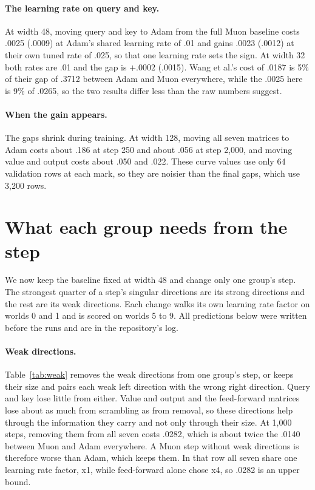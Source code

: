 \documentclass[11pt]{article}
\begin{document}
\paragraph{The learning rate on query and key.} At width 48, moving query and key to Adam from the full Muon baseline costs .0025 (.0009) at Adam's shared learning rate of .01 and gains .0023 (.0012) at their own tuned rate of .025, so that one learning rate sets the sign. At width 32 both rates are .01 and the gap is $+.0002$ (.0015). Wang et al.'s cost of .0187 is 5\% of their gap of .3712 between Adam and Muon everywhere, while the .0025 here is 9\% of .0265, so the two results differ less than the raw numbers suggest.

\paragraph{When the gain appears.} The gaps shrink during training. At width 128, moving all seven matrices to Adam costs about .186 at step 250 and about .056 at step 2,000, and moving value and output costs about .050 and .022. These curve values use only 64 validation rows at each mark, so they are noisier than the final gaps, which use 3,200 rows.


\section{What each group needs from the step}

We now keep the baseline fixed at width 48 and change only one group's step. The strongest quarter of a step's singular directions are its strong directions and the rest are its weak directions. Each change walks its own learning rate factor on worlds 0 and 1 and is scored on worlds 5 to 9. All predictions below were written before the runs and are in the repository's log.

\paragraph{Weak directions.} Table~\ref{tab:weak} removes the weak directions from one group's step, or keeps their size and pairs each weak left direction with the wrong right direction. Query and key lose little from either. Value and output and the feed-forward matrices lose about as much from scrambling as from removal, so these directions help through the information they carry and not only through their size. At 1,000 steps, removing them from all seven costs .0282, which is about twice the .0140 between Muon and Adam everywhere. A Muon step without weak directions is therefore worse than Adam, which keeps them. In that row all seven share one learning rate factor, x1, while feed-forward alone chose x4, so .0282 is an upper bound.
\end{document}
